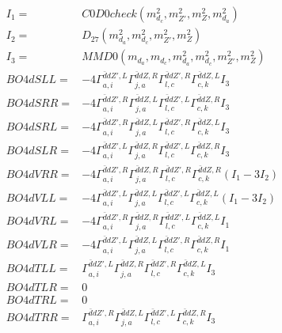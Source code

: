 \documentclass[A4,landscape]{article}
\begin{document}
\begin{align} 
I_1 = & C0D0check(m^2_{d_{{c}}}, m^2_{{Z'}}, m^2_{Z}, m^2_{d_{{a}}}) \\ 
I_2 = & D_{27}(m^2_{d_{{a}}}, m^2_{d_{{c}}}, m^2_{{Z'}}, m^2_{Z}) \\ 
I_3 = & MMD0(m_{d_{{a}}}, m_{d_{{c}}}, m^2_{d_{{a}}}, m^2_{d_{{c}}}, m^2_{{Z'}}, m^2_{Z}) \\ 
  BO4dSLL= & -4  \Gamma^{\bar{d}d {Z'} ,L}_{a, i} \Gamma^{\bar{d}d Z ,R}_{j, a} \Gamma^{\bar{d}d {Z'} ,R}_{l, c} \Gamma^{\bar{d}d Z ,L}_{c, k} I_3 \\ 
  BO4dSRR= & -4  \Gamma^{\bar{d}d {Z'} ,R}_{a, i} \Gamma^{\bar{d}d Z ,L}_{j, a} \Gamma^{\bar{d}d {Z'} ,L}_{l, c} \Gamma^{\bar{d}d Z ,R}_{c, k} I_3 \\ 
  BO4dSRL= & -4  \Gamma^{\bar{d}d {Z'} ,R}_{a, i} \Gamma^{\bar{d}d Z ,L}_{j, a} \Gamma^{\bar{d}d {Z'} ,R}_{l, c} \Gamma^{\bar{d}d Z ,L}_{c, k} I_3 \\ 
  BO4dSLR= & -4  \Gamma^{\bar{d}d {Z'} ,L}_{a, i} \Gamma^{\bar{d}d Z ,R}_{j, a} \Gamma^{\bar{d}d {Z'} ,L}_{l, c} \Gamma^{\bar{d}d Z ,R}_{c, k} I_3 \\ 
  BO4dVRR= & -4  \Gamma^{\bar{d}d {Z'} ,R}_{a, i} \Gamma^{\bar{d}d Z ,R}_{j, a} \Gamma^{\bar{d}d {Z'} ,R}_{l, c} \Gamma^{\bar{d}d Z ,R}_{c, k} (I_1 - 3 I_2) \\ 
  BO4dVLL= & -4  \Gamma^{\bar{d}d {Z'} ,L}_{a, i} \Gamma^{\bar{d}d Z ,L}_{j, a} \Gamma^{\bar{d}d {Z'} ,L}_{l, c} \Gamma^{\bar{d}d Z ,L}_{c, k} (I_1 - 3 I_2) \\ 
  BO4dVRL= & -4  \Gamma^{\bar{d}d {Z'} ,R}_{a, i} \Gamma^{\bar{d}d Z ,R}_{j, a} \Gamma^{\bar{d}d {Z'} ,L}_{l, c} \Gamma^{\bar{d}d Z ,L}_{c, k} I_1 \\ 
  BO4dVLR= & -4  \Gamma^{\bar{d}d {Z'} ,L}_{a, i} \Gamma^{\bar{d}d Z ,L}_{j, a} \Gamma^{\bar{d}d {Z'} ,R}_{l, c} \Gamma^{\bar{d}d Z ,R}_{c, k} I_1 \\ 
  BO4dTLL= &  \Gamma^{\bar{d}d {Z'} ,L}_{a, i} \Gamma^{\bar{d}d Z ,R}_{j, a} \Gamma^{\bar{d}d {Z'} ,R}_{l, c} \Gamma^{\bar{d}d Z ,L}_{c, k} I_3 \\ 
  BO4dTLR= & 0 \\ 
  BO4dTRL= & 0 \\ 
  BO4dTRR= &  \Gamma^{\bar{d}d {Z'} ,R}_{a, i} \Gamma^{\bar{d}d Z ,L}_{j, a} \Gamma^{\bar{d}d {Z'} ,L}_{l, c} \Gamma^{\bar{d}d Z ,R}_{c, k} I_3 \\ 
\end{align} 
\end{document}
